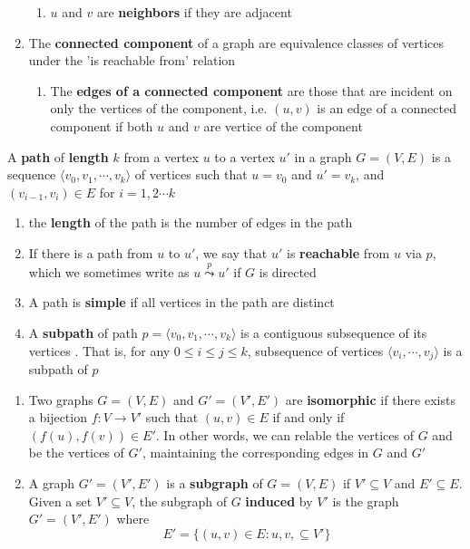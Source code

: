 \documentclass[11pt]{article}
\begin{document}
\begin{defn*}
\begin{enumerate}
\begin{enumerate}
            \item $u$ and $v$ are \textbf{neighbors} if they are adjacent
        \end{enumerate}
        \item The \textbf{connected component} of a graph are equivalence classes of vertices under the 'is reachable from' relation
        \begin{enumerate}
            \item The \textbf{edges of a connected component} are those that are incident on only the vertices of the component, i.e. $(u,v)$ is an edge of a connected component if both $u$ and $v$ are vertice of the component 
        \end{enumerate}
    \end{enumerate}
\end{defn*}

\begin{defn*}
A \textbf{path} of \textbf{length} $k$ from a vertex $u$ to a vertex $u'$ in a graph $G = (V, E)$ is a sequence $\langle v_0, v_1, \cdots, v_k \rangle$ of vertices such that $u = v_0$ and $u' = v_k$, and $(v_{i-1}, v_i) \in E$ for $i = 1, 2\cdots k$
\begin{enumerate}
    \item the \textbf{length} of the path is the number of edges in the path 
    \item If there is a path from $u$ to $u'$, we say that $u'$ is \textbf{reachable} from $u$ via $p$, which we sometimes write as $u \overset{p}{\leadsto} u'$ if $G$ is directed 
    \item A path is \textbf{simple} if all vertices in the path are distinct 
    \item A \textbf{subpath} of path $p=\langle v_0, v_1, \cdots, v_k \rangle$ is a contiguous subsequence of its vertices . That is, for any $0 \leq i \leq j\leq k$, subsequence of vertices $\langle v_i, \cdots, v_j \rangle$ is a subpath of $p$
\end{enumerate}
\end{defn*}



\begin{defn*}
    \begin{enumerate}
        \item Two graphs $G = (V, E)$ and $G' = (V', E')$ are \textbf{isomorphic} if there exists a bijection $f: V \to V'$ such that $(u,v) \in E$ if and only if $(f(u), f(v))\in E'$. In other words, we can relable the vertices of $G$ and be the vertices of $G'$, maintaining the corresponding edges in $G$ and $G'$
        \item A graph $G' = (V', E')$ is a \textbf{subgraph} of $G = (V, E)$ if $V' \subseteq V$ and $E' \subseteq E$. Given a set $V' \subseteq V$, the subgraph of $G$ \textbf{induced} by $V'$ is the graph $G'= (V', E')$ where 
        \[
            E' = \{ (u,v) \in E: u,v, \subseteq V'\}
        \]
    \end{enumerate}
\end{defn*}
\end{document}
